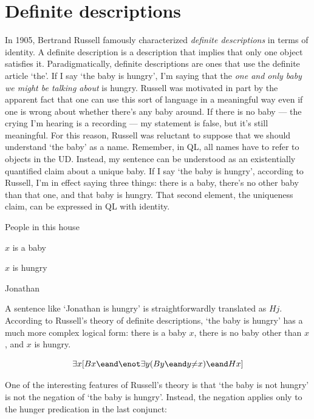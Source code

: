 \section{Definite descriptions}
\label{sec.defdesc}
In 1905, Bertrand Russell famously characterized \emph{definite descriptions} in terms of identity. A definite description is a description that implies that only one object satisfies it. Paradigmatically, definite descriptions are ones that use the definite article `the'. If I say `the baby is hungry', I'm saying that the \emph{one and only baby we might be talking about} is hungry. Russell was motivated in part by the apparent fact that one can use this sort of language in a meaningful way even if one is wrong about whether there's any baby around. If there is no baby --- the crying I'm hearing is a recording --- my statement is false, but it's still meaningful. For this reason, Russell was reluctant to suppose that we should understand `the baby' as a name. Remember, in QL, all names have to refer to objects in the UD. Instead, my sentence can be understood as an existentially quantified claim about a unique baby. If I say `the baby is hungry', according to Russell, I'm in effect saying three things: there is a baby, there's no other baby than that one, and that baby is hungry. That second element, the uniqueness claim, can be expressed in QL with identity. 

\begin{ekey}
\item[UD:]People in this house
\item[Bx:]$x$ is a baby
\item[Hx:]$x$ is hungry
\item[j:]Jonathan
\end{ekey}

A sentence like `Jonathan is hungry' is straightforwardly translated as $Hj$. According to Russell's theory of definite descriptions, `the baby is hungry' has a much more complex logical form: there is a baby $x$, there is no baby other than $x$, and $x$ is hungry.

\begin{equation*}
\exists x [Bx \eand \enot \exists y (By \eand y {\neq} x) \eand Hx]
\end{equation*}

One of the interesting features of Russell's theory is that `the baby is not hungry' is not the negation of `the baby is hungry'. Instead, the negation applies only to the hunger predication in the last conjunct:

